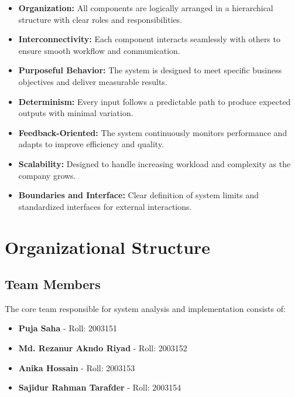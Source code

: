 \documentclass[12pt,a4paper]{article}
\begin{document}
\begin{itemize}
    \item \textbf{Organization:} All components are logically arranged in a hierarchical structure with clear roles and responsibilities.
    
    \item \textbf{Interconnectivity:} Each component interacts seamlessly with others to ensure smooth workflow and communication.
    
    \item \textbf{Purposeful Behavior:} The system is designed to meet specific business objectives and deliver measurable results.
    
    \item \textbf{Determinism:} Every input follows a predictable path to produce expected outputs with minimal variation.
    
    \item \textbf{Feedback-Oriented:} The system continuously monitors performance and adapts to improve efficiency and quality.
    
    \item \textbf{Scalability:} Designed to handle increasing workload and complexity as the company grows.
    
    \item \textbf{Boundaries and Interface:} Clear definition of system limits and standardized interfaces for external interactions.
\end{itemize}

\section{Organizational Structure}

\subsection{Team Members}
The core team responsible for system analysis and implementation consists of:

\begin{itemize}
    \item \textbf{Puja Saha} - Roll: 2003151
    \item \textbf{Md. Rezanur Akndo Riyad} - Roll: 2003152
    \item \textbf{Anika Hossain} - Roll: 2003153
    \item \textbf{Sajidur Rahman Tarafder} - Roll: 2003154
\end{itemize}
\end{document}
